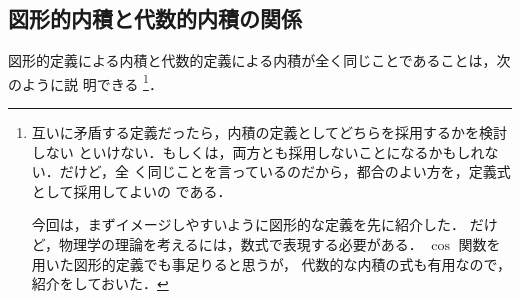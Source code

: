             \subsection{図形的内積と代数的内積の関係}
                図形的定義による内積と代数的定義による内積が全く同じことであることは，次のように説
                明できる
                    \footnote{
                        互いに矛盾する定義だったら，内積の定義としてどちらを採用するかを検討しない
                        といけない．もしくは，両方とも採用しないことになるかもしれない．だけど，全
                        く同じことを言っているのだから，都合のよい方を，定義式として採用してよいの
                        である．

                        今回は，まずイメージしやすいように図形的な定義を先に紹介した．
                        だけど，物理学の理論を考えるには，数式で表現する必要がある．
                        $\cos$ 関数を用いた図形的定義でも事足りると思うが，
                        代数的な内積の式も有用なので，紹介をしておいた．
                    }．

